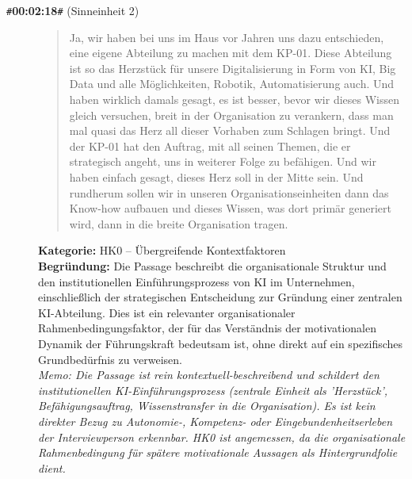 \begin{description}
  \item[\texttt{\#}\textbf{00:02:18}\texttt{\#} (Sinneinheit 2)]
  \begin{quote}
  Ja, wir haben bei uns im Haus vor Jahren uns dazu entschieden, eine eigene Abteilung zu machen mit dem KP-01. Diese Abteilung ist so das Herzstück für unsere Digitalisierung in Form von KI, Big Data und alle Möglichkeiten, Robotik, Automatisierung auch. Und haben wirklich damals gesagt, es ist besser, bevor wir dieses Wissen gleich versuchen, breit in der Organisation zu verankern, dass man mal quasi das Herz all dieser Vorhaben zum Schlagen bringt. Und der KP-01 hat den Auftrag, mit all seinen Themen, die er strategisch angeht, uns in weiterer Folge zu befähigen. Und wir haben einfach gesagt, dieses Herz soll in der Mitte sein. Und rundherum sollen wir in unseren Organisationseinheiten dann das Know-how aufbauen und dieses Wissen, was dort primär generiert wird, dann in die breite Organisation tragen.
  \end{quote}
  \textbf{Kategorie:} HK0 -- Übergreifende Kontextfaktoren\\
  \textbf{Begr\"undung:} Die Passage beschreibt die organisationale Struktur und den institutionellen Einführungsprozess von KI im Unternehmen, einschließlich der strategischen Entscheidung zur Gründung einer zentralen KI-Abteilung. Dies ist ein relevanter organisationaler Rahmenbedingungsfaktor, der für das Verständnis der motivationalen Dynamik der Führungskraft bedeutsam ist, ohne direkt auf ein spezifisches Grundbedürfnis zu verweisen.
  \\\textit{Memo: Die Passage ist rein kontextuell-beschreibend und schildert den institutionellen KI-Einführungsprozess (zentrale Einheit als 'Herzstück', Befähigungsauftrag, Wissenstransfer in die Organisation). Es ist kein direkter Bezug zu Autonomie-, Kompetenz- oder Eingebundenheitserleben der Interviewperson erkennbar. HK0 ist angemessen, da die organisationale Rahmenbedingung für spätere motivationale Aussagen als Hintergrundfolie dient.}
\end{description}
\medskip

